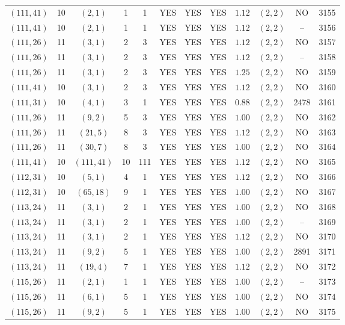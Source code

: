 \begin{longtable}{|c|c|c|c|c|c|c|c|c|c|c|c|}
$(111,41)$ & 10 & $(2,1)$ & 1 & 1 & YES & YES & YES & $1.12$ & $(2,2)$ & NO & 3155\\
$(111,41)$ & 10 & $(2,1)$ & 1 & 1 & YES & YES & YES & $1.12$ & $(2,2)$ & -- & 3156\\
$(111,26)$ & 11 & $(3,1)$ & 2 & 3 & YES & YES & YES & $1.12$ & $(2,2)$ & NO & 3157\\
$(111,26)$ & 11 & $(3,1)$ & 2 & 3 & YES & YES & YES & $1.12$ & $(2,2)$ & -- & 3158\\
$(111,26)$ & 11 & $(3,1)$ & 2 & 3 & YES & YES & YES & $1.25$ & $(2,2)$ & NO & 3159\\
$(111,41)$ & 10 & $(3,1)$ & 2 & 3 & YES & YES & YES & $1.12$ & $(2,2)$ & NO & 3160\\
$(111,31)$ & 10 & $(4,1)$ & 3 & 1 & YES & YES & YES & $0.88$ & $(2,2)$ & 2478 & 3161\\
$(111,26)$ & 11 & $(9,2)$ & 5 & 3 & YES & YES & YES & $1.00$ & $(2,2)$ & NO & 3162\\
$(111,26)$ & 11 & $(21,5)$ & 8 & 3 & YES & YES & YES & $1.12$ & $(2,2)$ & NO & 3163\\
$(111,26)$ & 11 & $(30,7)$ & 8 & 3 & YES & YES & YES & $1.00$ & $(2,2)$ & NO & 3164\\
$(111,41)$ & 10 & $(111,41)$ & 10 & 111 & YES & YES & YES & $1.12$ & $(2,2)$ & NO & 3165\\
$(112,31)$ & 10 & $(5,1)$ & 4 & 1 & YES & YES & YES & $1.12$ & $(2,2)$ & NO & 3166\\
$(112,31)$ & 10 & $(65,18)$ & 9 & 1 & YES & YES & YES & $1.00$ & $(2,2)$ & NO & 3167\\
$(113,24)$ & 11 & $(3,1)$ & 2 & 1 & YES & YES & YES & $1.00$ & $(2,2)$ & NO & 3168\\
$(113,24)$ & 11 & $(3,1)$ & 2 & 1 & YES & YES & YES & $1.00$ & $(2,2)$ & -- & 3169\\
$(113,24)$ & 11 & $(3,1)$ & 2 & 1 & YES & YES & YES & $1.12$ & $(2,2)$ & NO & 3170\\
$(113,24)$ & 11 & $(9,2)$ & 5 & 1 & YES & YES & YES & $1.00$ & $(2,2)$ & 2891 & 3171\\
$(113,24)$ & 11 & $(19,4)$ & 7 & 1 & YES & YES & YES & $1.12$ & $(2,2)$ & NO & 3172\\
$(115,26)$ & 11 & $(2,1)$ & 1 & 1 & YES & YES & YES & $1.00$ & $(2,2)$ & -- & 3173\\
$(115,26)$ & 11 & $(6,1)$ & 5 & 1 & YES & YES & YES & $1.00$ & $(2,2)$ & NO & 3174\\
$(115,26)$ & 11 & $(9,2)$ & 5 & 1 & YES & YES & YES & $1.00$ & $(2,2)$ & NO & 3175\\

\end{longtable}

